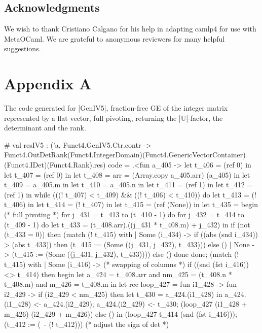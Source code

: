 \documentclass{llncs}
\begin{document}
\subsection*{Acknowledgments}
We wish to thank Cristiano Calgano for his help in adapting camlp4 for
use with MetaOCaml. We are grateful to anonymous reviewers for many
helpful suggestions.




\section{Appendix A}
The code generated for |GenIV5|, fraction-free GE of the integer matrix
represented by a flat vector, full pivoting, returning the |U|-factor,
the determinant and the rank.
\begin{code2}
# val resIV5 :
  ('a,
   Funct4.GenIV5.Ctr.contr ->
   Funct4.OutDetRank(Funct4.IntegerDomain)(Funct4.GenericVectorContainer)
                    (Funct4.IDet)(Funct4.Rank).res)
  code =
  .<fun a_405 ->
   let t_406 = (ref 0) in let t_407 = (ref 0) in
   let t_408 = {arr = (Array.copy a_405.arr)} (a_405) in
   let t_409 = a_405.m in let t_410 = a_405.n in
   let t_411 = (ref 1) in let t_412 = (ref 1) in
   while (((! t_407) < t_409) && ((! t_406) < t_410)) do
    let t_413 = (! t_406) in let t_414 = (! t_407) in
    let t_415 = (ref (None)) in
    let t_435 =
     begin  (* full pivoting *)
      for j_431 = t_413 to (t_410 - 1) do
       for j_432 = t_414 to (t_409 - 1) do
        let t_433 = (t_408.arr).((j_431 * t_408.m) + j_432) in
        if (not (t_433 = 0)) then
         (match (! t_415) with
          | Some (i_434) ->
             if ((abs (snd i_434)) > (abs t_433)) then
              (t_415 := (Some ((j_431, j_432), t_433))) else ()
          | None -> (t_415 := (Some ((j_431, j_432), t_433))))
        else ()
       done
      done;
      (match (! t_415) with
       | Some (i_416) ->  (* swapping of columns *)
          if ((snd (fst i_416)) <> t_414) then begin
           let a_424 = t_408.arr
           and nm_425 = (t_408.n * t_408.m)
           and m_426 = t_408.m in
           let rec loop_427 =
            fun i1_428 ->
             fun i2_429 ->
              if (i2_429 < nm_425) then
               let t_430 = a_424.(i1_428) in
               a_424.(i1_428) <- a_424.(i2_429);
               a_424.(i2_429) <- t_430;
               (loop_427 (i1_428 + m_426) (i2_429 + m_426))
              else () in
           (loop_427 t_414 (snd (fst i_416)));
           (t_412 := (~- (! t_412))) (* adjust the sign of det *)

\end{code2}
\end{document}
